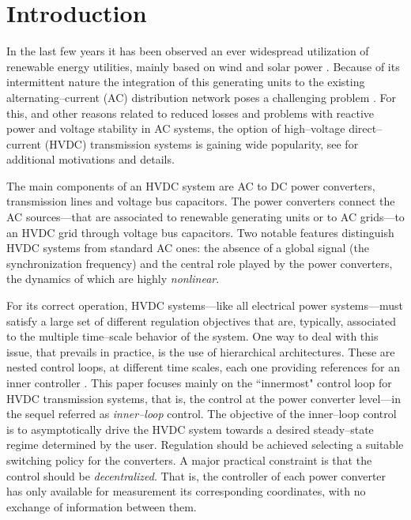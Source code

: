 \documentclass[5p,twocolumn]{elsarticle}
\numberwithin{equation}{section}
\begin{document}
\section{Introduction}\label{intro}
In the last few years it has been observed an ever widespread utilization of renewable energy utilities, mainly based on wind and solar power \cite{jager,ANDERS}. Because of its intermittent nature the integration of
this generating units to the existing alternating--current (AC) distribution network poses a challenging problem \cite{carra,lund}. For this, and other reasons related to reduced losses and problems with reactive
power and voltage stability in AC systems, the option of high--voltage direct--current (HVDC) transmission systems is gaining wide popularity, see \cite{ANDERS,kirby,joha} for additional motivations and details.

The main components of an HVDC system are  AC to DC power converters, transmission lines and voltage bus capacitors. The power converters connect the AC sources---that are associated to renewable generating
units or to AC grids---to an HVDC grid through voltage bus capacitors. Two notable features distinguish HVDC systems from standard AC ones: the absence of a global signal (the synchronization frequency) and the central role
played by the power converters, the dynamics of which are highly {\em nonlinear}.

For its correct operation, HVDC systems---like all electrical power systems---must satisfy a large set of different regulation objectives that are, typically, associated to the multiple time--scale behavior of
the system. One way to deal with this issue, that prevails in practice, is the use of hierarchical architectures. These are nested control loops, at different time scales, each one providing references for an
inner controller \cite{kazm,iravani}. This paper focuses mainly on the ``innermost" control loop for HVDC transmission systems, that is, the control at the power converter level---in the
sequel referred as {\em inner--loop} control. The objective of the inner--loop control is to asymptotically drive the HVDC system towards a desired steady--state regime determined by the
user. Regulation should be achieved selecting a suitable switching policy for the converters. A major practical constraint is that the control should be {\em decentralized}. That is, the controller of each
power converter has only available for measurement its corresponding coordinates, with no exchange of information between them.
\end{document}
